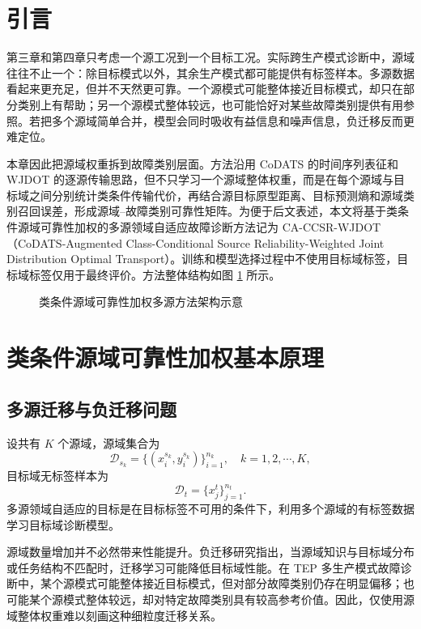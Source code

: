 \documentclass{seuthesis-2022}
\begin{document}
\section{引言}

第三章和第四章只考虑一个源工况到一个目标工况。实际跨生产模式诊断中，源域往往不止一个：除目标模式以外，其余生产模式都可能提供有标签样本。多源数据看起来更充足，但并不天然更可靠。一个源模式可能整体接近目标模式，却只在部分类别上有帮助；另一个源模式整体较远，也可能恰好对某些故障类别提供有用参照。若把多个源域简单合并，模型会同时吸收有益信息和噪声信息，负迁移反而更难定位。

本章因此把源域权重拆到故障类别层面。方法沿用 CoDATS 的时间序列表征和 WJDOT 的逐源传输思路，但不只学习一个源域整体权重，而是在每个源域与目标域之间分别统计类条件传输代价，再结合源目标原型距离、目标预测熵和源域类别召回误差，形成源域--故障类别可靠性矩阵。为便于后文表述，本文将基于类条件源域可靠性加权的多源领域自适应故障诊断方法记为 CA-CCSR-WJDOT（CoDATS-Augmented Class-Conditional Source Reliability-Weighted Joint Distribution Optimal Transport）。训练和模型选择过程中不使用目标域标签，目标域标签仅用于最终评价。方法整体结构如图 \ref{fig:ch5_CA_CCSR_WJDOT} 所示。

\begin{figure}[!htbp]
    \centering
    \resizebox{\textwidth}{!}{\ignorespaces\unskip}
    \caption{类条件源域可靠性加权多源方法架构示意}
    \label{fig:ch5_CA_CCSR_WJDOT}
\end{figure}

\section{类条件源域可靠性加权基本原理}
\subsection{多源迁移与负迁移问题}

设共有 $K$ 个源域，源域集合为
\begin{equation}
    \mathcal{D}_{s_k}
    =
    \{(x_i^{s_k},y_i^{s_k})\}_{i=1}^{n_k},
    \quad
    k=1,2,\cdots,K,
\end{equation}
目标域无标签样本为
\begin{equation}
    \mathcal{D}_t=\{x_j^t\}_{j=1}^{n_t}.
\end{equation}
多源领域自适应的目标是在目标标签不可用的条件下，利用多个源域的有标签数据学习目标域诊断模型。

源域数量增加并不必然带来性能提升。负迁移研究指出，当源域知识与目标域分布或任务结构不匹配时，迁移学习可能降低目标域性能\cite{zhang2023negativetransfer}。在 TEP 多生产模式故障诊断中，某个源模式可能整体接近目标模式，但对部分故障类别仍存在明显偏移；也可能某个源模式整体较远，却对特定故障类别具有较高参考价值。因此，仅使用源域整体权重难以刻画这种细粒度迁移关系。
\end{document}
